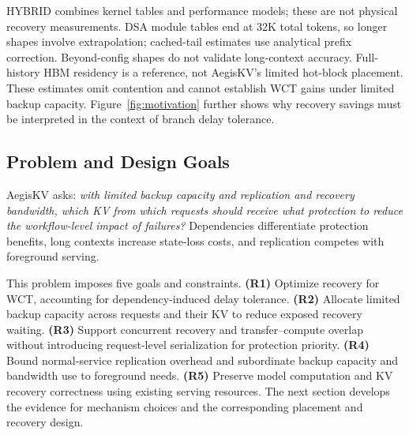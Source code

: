 HYBRID combines kernel tables and performance models; these are not
physical recovery measurements. DSA module tables end at 32K total
tokens, so longer shapes involve extrapolation; cached-tail estimates
use analytical prefix correction. Beyond-config shapes do not validate
long-context accuracy. Full-history HBM residency is a reference, not
AegisKV's limited hot-block placement. These estimates omit contention
and cannot establish WCT gains under limited backup capacity.
Figure~\ref{fig:motivation} further shows why recovery savings must be
interpreted in the context of branch delay tolerance.

\subsection{Problem and Design Goals}
\label{sec:motivation-goals}

AegisKV asks: \emph{with limited backup capacity and replication and
recovery bandwidth, which KV from which requests should receive what
protection to reduce the workflow-level impact of failures?}
Dependencies differentiate protection benefits, long contexts increase
state-loss costs, and replication competes with foreground serving.

This problem imposes five goals and constraints.
\textbf{(R1)} Optimize recovery for WCT, accounting for dependency-induced
delay tolerance.
\textbf{(R2)} Allocate limited backup capacity across requests and their
KV to reduce exposed recovery waiting.
\textbf{(R3)} Support concurrent recovery and transfer--compute overlap
without introducing request-level serialization for protection priority.
\textbf{(R4)} Bound normal-service replication overhead and subordinate
backup capacity and bandwidth use to foreground needs.
\textbf{(R5)} Preserve model computation and KV recovery correctness using
existing serving resources.
The next section develops the evidence for mechanism choices and the
corresponding placement and recovery design.
